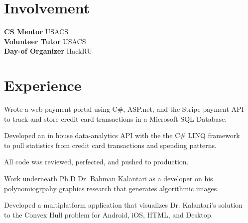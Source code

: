 \documentclass[]{deedy-resume-openfont}
\begin{document}
\begin{minipage}[t]{0.33\textwidth}
\section{Involvement}
\textbf{CS Mentor}  \textbullet{} USACS\\ 
\textbf{Volunteer Tutor} \textbullet{} USACS\\ 
\textbf{Day-of Organizer} \textbullet{} HackRU \\

\sectionsep


%
%

\end{minipage} 
\hfill
\begin{minipage}[t]{0.66\textwidth} 


\section{Experience}

\vspace{\topsep} %
\begin{tightemize}
\item Wrote a web payment portal using C\#, ASP.net, and the Stripe payment API \\to track and store credit card transactions in a Microsoft SQL Database.
\item Developed an in house data-analytics API with the the C\# LINQ framework \\to pull statistics from credit card transactions and spending patterns. 
\item All code was reviewed, perfected, and pushed to production.
\end{tightemize}
\sectionsep

\begin{tightemize}
\item Work underneath Ph.D Dr. Bahman Kalantari as a developer on his polynomiogrpahy graphics research that generates algorithmic images.  
\item Developed a multiplatform application that visualizes Dr. Kalantari's solution \\ to the Convex Hull problem for Android, iOS, HTML, and Desktop. 
\end{tightemize}
\sectionsep


\end{minipage}
\end{document}
